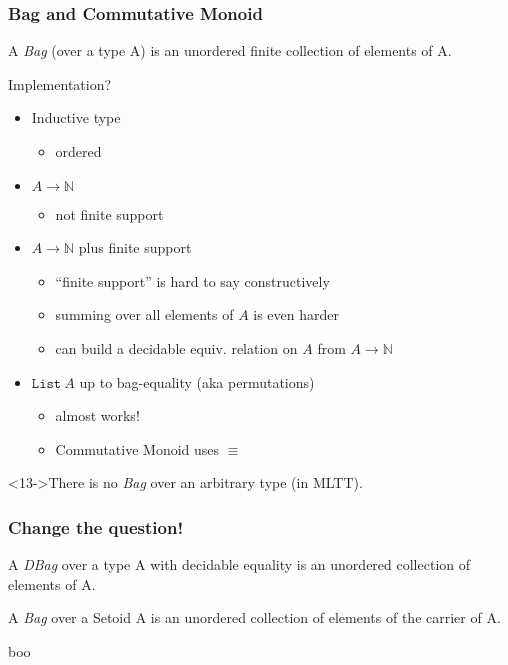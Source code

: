 \documentclass[serif,mathserif,professionalfont,10pt]{beamer}
\begin{document}
\begin{frame}
\frametitle{Bag and Commutative Monoid}
\begin{definition}
A \emph{Bag} (over a type A) is an unordered finite collection
of elements of A.
\end{definition}
\pause
Implementation?
\begin{itemize}
\item<2-> Inductive type
\begin{itemize}
\item<3-> ordered
\end{itemize}
\item<4-> $A \rightarrow \mathbb{N}$
\begin{itemize}
\item<5-> not finite support
\end{itemize}
\item<6-> $A \rightarrow \mathbb{N}$ plus finite support
\begin{itemize}
\item<7-> ``finite support'' is hard to say constructively
\item<8-> summing over all elements of $A$ is even harder
\item<9-> can build a decidable equiv. relation on $A$ from $A \rightarrow \mathbb{N}$
\end{itemize}
\item<10-> $\texttt{List}\ A$ up to bag-equality (aka permutations)
\begin{itemize}
\item<11-> almost works!
\item<12-> Commutative Monoid uses $\equiv$
\end{itemize}
\end{itemize}
\begin{theorem}<13->There is no \emph{Bag} over an arbitrary type (in MLTT).
\end{theorem}
\end{frame}

\begin{frame}
\frametitle{Change the question!}
\begin{definition}
A \emph{DBag} over a type A with decidable equality is an unordered
collection of elements of A.
\end{definition}
\pause
\begin{definition}
A \emph{Bag} over a Setoid A is an unordered
collection of elements of the carrier of A.
\end{definition}
\pause
boo
\end{frame}
\end{document}
